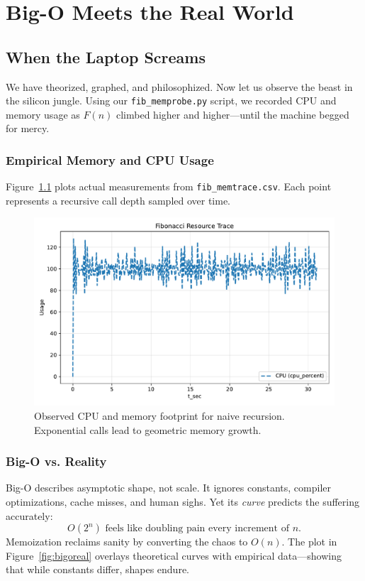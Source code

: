 \chapter{Big-O Meets the Real World}
\label{ch:big-o-reality}

\section{When the Laptop Screams}

We have theorized, graphed, and philosophized. Now let us observe
the beast in the silicon jungle. Using our \texttt{fib\_memprobe.py}
script, we recorded CPU and memory usage as $F(n)$ climbed higher
and higher—until the machine begged for mercy.

\subsection{Empirical Memory and CPU Usage}
Figure~\ref{fig:memtrace} plots actual measurements from
\texttt{fib\_memtrace.csv}. Each point represents a recursive call
depth sampled over time.

\begin{figure}[htbp]
  \centering
  \includegraphics[width=.9\textwidth]{chapters/fib_memprobe_plot.pdf}
  \caption{Observed CPU and memory footprint for naive recursion.
  Exponential calls lead to geometric memory growth.}
  \label{fig:memtrace}
\end{figure}

\subsection{Big-O vs. Reality}
Big-O describes asymptotic shape, not scale. It ignores constants,
compiler optimizations, cache misses, and human sighs. Yet its
\emph{curve} predicts the suffering accurately:
\[
O(2^n) \text{ feels like doubling pain every increment of } n.
\]
Memoization reclaims sanity by converting the chaos to $O(n)$.
The plot in Figure~\ref{fig:bigoreal} overlays theoretical curves
with empirical data—showing that while constants differ, shapes
endure.


